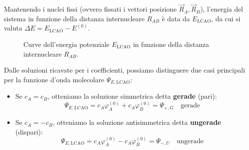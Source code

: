 Mantenendo i nuclei fissi (ovvero fissati i vettori posizione \( \vec{R}_A, \vec{R}_B \)), l'energia del sistema in funzione della distanza internucleare \( R_{AB} \) è data da \( E_{\text{LCAO}} \), da cui si valuta \( \Delta E = E_{\text{LCAO}} - E^{(0)} \).

\begin{figure}[htbp]
    \centering
    \caption{Curve dell'energia potenziale \( E_{\text{LCAO}} \) in funzione della distanza internucleare \( R_{AB} \).}
    \label{fig:curve_energia_lcao}
\end{figure}


Dalle soluzioni ricavate per i coefficienti, possiamo distinguere due casi principali per la funzione d'onda molecolare \(\Psi_{E, \text{LCAO}}\):

\begin{itemize}
    \item Se \( c_A = c_B \), otteniamo la soluzione simmetrica detta \textbf{gerade} (pari):
    \begin{equation}
        \Psi_{E, \text{LCAO}} = c_A \varphi_A^{(0)} + c_A \varphi_B^{(0)} = \Psi_{+, G} \quad \text{gerade}
    \end{equation}
    
    \item Se \( c_A = -c_B \), otteniamo la soluzione antisimmetrica detta \textbf{ungerade} (dispari):
    \begin{equation}
        \Psi_{E, \text{LCAO}} = c_A \varphi_A^{(0)} - c_A \varphi_B^{(0)} = \Psi_{-, U} \quad \text{ungerade}
    \end{equation}
\end{itemize}

